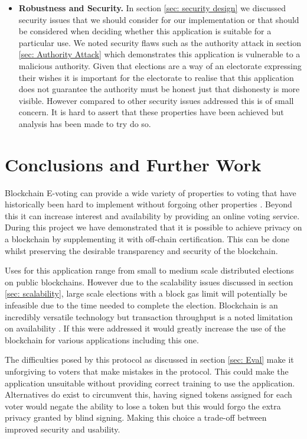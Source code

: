 \documentclass{entcs}
\begin{document}
\begin{itemize}
    \item \textbf{Robustness and Security.} In section \ref{sec: security design} we discussed security issues that we should consider for our implementation or that should be considered when deciding whether this application is suitable for a particular use. We noted security flaws such as the authority attack in section \ref{sec: Authority Attack} which demonstrates this application is vulnerable to a malicious authority. Given that elections are a way of an electorate expressing their wishes it is important for the electorate to realise that this application does not guarantee the authority must be honest just that dishonesty is more visible. However compared to other security issues addressed this is of small concern. It is hard to assert that these properties have been achieved but analysis has been made to try do so.
\end{itemize}


\section{Conclusions and Further Work}
Blockchain E-voting can provide a wide variety of properties to voting that have historically been hard to implement without forgoing other properties \cite{Chevallier-mames06onsome}. Beyond this it can increase interest and availability by providing an online voting service. During this project we have demonstrated that it is possible to achieve privacy on a blockchain by supplementing it with off-chain certification. This can be done whilst preserving the desirable transparency and security of the blockchain. 

Uses for this application range from small to medium scale distributed elections on public blockchains. However due to the scalability issues discussed in section \ref{sec: scalability}, large scale elections with a block gas limit will potentially be infeasible due to the time needed to complete the election. Blockchain is an incredibly versatile technology but transaction throughput is a noted limitation on availability \cite{weber2017availability}. If this were addressed it would greatly increase the use of the blockchain for various applications including this one.

The difficulties posed by this protocol as discussed in section \ref{sec: Eval} make it unforgiving to voters that make mistakes in the protocol. This could make the application unsuitable without providing correct training to use the application. Alternatives do exist to circumvent this, having signed tokens assigned for each voter would negate the ability to lose a token but this would forgo the extra privacy granted by blind signing. Making this choice a trade-off between improved security and usability.
\end{document}
